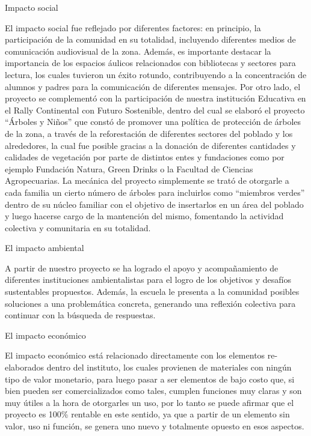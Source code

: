 \begin{fullwidth}
\protect\hypertarget{_3qahj1i8c1w3}{}{\protect\hypertarget{_dje8yrrvew7s}{}{}}Impacto
social

El impacto social fue reflejado por diferentes factores: en principio,
la participación de la comunidad en su totalidad, incluyendo diferentes
medios de comunicación audiovisual de la zona. Además, es importante
destacar la importancia de los espacios áulicos relacionados con
bibliotecas y sectores para lectura, los cuales tuvieron un éxito
rotundo, contribuyendo a la concentración de alumnos y padres para la
comunicación de diferentes mensajes. Por otro lado, el proyecto se
complementó con la participación de nuestra institución Educativa en el
Rally Continental con Futuro Sostenible, dentro del cual se elaboró el
proyecto ``Árboles y Niños'' que constó de promover una política de
protección de árboles de la zona, a través de la reforestación de
diferentes sectores del poblado y los alrededores, la cual fue posible
gracias a la donación de diferentes cantidades y calidades de vegetación
por parte de distintos entes y fundaciones como por ejemplo Fundación
Natura, Green Drinks o la Facultad de Ciencias Agropecuarias. La
mecánica del proyecto simplemente se trató de otorgarle a cada familia
un cierto número de árboles para incluirlos como ``miembros verdes''
dentro de su núcleo familiar con el objetivo de insertarlos en un área
del poblado y luego hacerse cargo de la mantención del mismo, fomentando
la actividad colectiva y comunitaria en su totalidad.

\protect\hypertarget{_e8d930zeu4l6}{}{}El impacto ambiental

A partir de nuestro proyecto se ha logrado el apoyo y acompañamiento de
diferentes instituciones ambientalistas para el logro de los objetivos y
desafíos sustentables propuestos. Además, la escuela le presenta a la
comunidad posibles soluciones a una problemática concreta, generando una
reflexión colectiva para continuar con la búsqueda de respuestas.

\protect\hypertarget{_dld5dcvfjax6}{}{}El impacto económico

El impacto económico está relacionado directamente con los elementos
re-elaborados dentro del instituto, los cuales provienen de materiales
con ningún tipo de valor monetario, para luego pasar a ser elementos de
bajo costo que, si bien pueden ser comercializados como tales, cumplen
funciones muy claras y son muy útiles a la hora de otorgarles un uso,
por lo tanto se puede aﬁrmar que el proyecto es 100\% rentable en este
sentido, ya que a partir de un elemento sin valor, uso ni función, se
genera uno nuevo y totalmente opuesto en esos aspectos.


\end{fullwidth}

